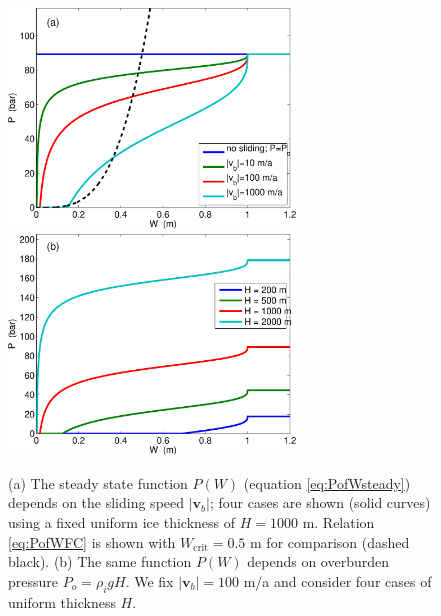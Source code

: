 \documentclass[11pt,final]{amsart}%
\newcommand\bv{\mathbf{v}}
\begin{document}
\begin{figure}[ht]
\includegraphics[width=3.0in,keepaspectratio=true]{figs/psteady-vb} \, \includegraphics[width=3.0in,keepaspectratio=true]{figs/psteady-Po}
\medskip
\caption{(a) The steady state function $P(W)$ (equation \eqref{eq:PofWsteady}) depends on the sliding speed $|\bv_b|$; four cases are shown (solid curves) using a fixed uniform ice thickness of $H=1000$ m.  Relation \eqref{eq:PofWFC} is shown with $W_{\text{crit}}=0.5$ m for comparison (dashed black).  (b)  The same function $P(W)$ depends on overburden pressure $P_o=\rho_i g H$.  We fix $|\bv_b|=100$ m/a and consider four cases of uniform thickness $H$.}
\label{fig:psteady}
\end{figure}
\end{document}
